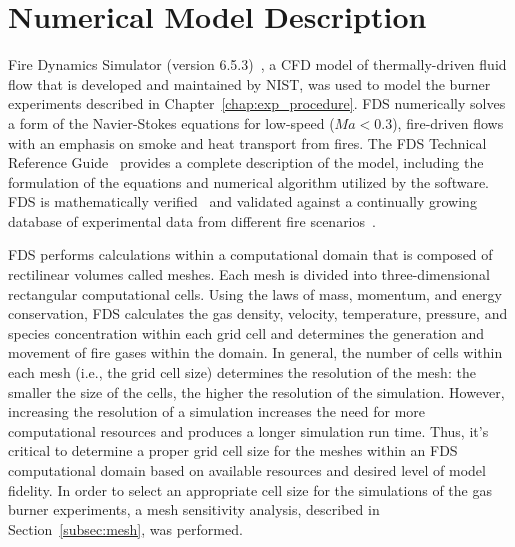
\renewcommand{\thechapter}{4}
\label{chap:model_descr}

\chapter{Numerical Model Description}
Fire Dynamics Simulator (version 6.5.3)~\cite{FDS_Users_Guide}, a CFD model of thermally-driven fluid flow that is developed and maintained by NIST, was used to model the burner experiments described in Chapter~\ref{chap:exp_procedure}. FDS numerically solves a form of the Navier-Stokes equations for low-speed ($Ma < 0.3$), fire-driven flows with an emphasis on smoke and heat transport from fires. The FDS Technical Reference Guide~\cite{FDS_Tech_Guide} provides a complete description of the model, including the formulation of the equations and numerical algorithm utilized by the software. FDS is mathematically verified~\cite{FDS_Verification_Guide} and validated against a continually growing database of experimental data from different fire scenarios~\cite{FDS_Validation_Guide}. 

FDS performs calculations within a computational domain that is composed of rectilinear volumes called meshes. Each mesh is divided into three-dimensional rectangular computational cells. Using the laws of mass, momentum, and energy conservation, FDS calculates the gas density, velocity, temperature, pressure, and species concentration within each grid cell and determines the generation and movement of fire gases within the domain. In general, the number of cells within each mesh (i.e., the grid cell size) determines the resolution of the mesh: the smaller the size of the cells, the higher the resolution of the simulation. However, increasing the resolution of a simulation increases the need for more computational resources and produces a longer simulation run time. Thus, it's critical to determine a proper grid cell size for the meshes within an FDS computational domain based on available resources and desired level of model fidelity. In order to select an appropriate cell size for the simulations of the gas burner experiments, a mesh sensitivity analysis, described in Section~\ref{subsec:mesh}, was performed.  

